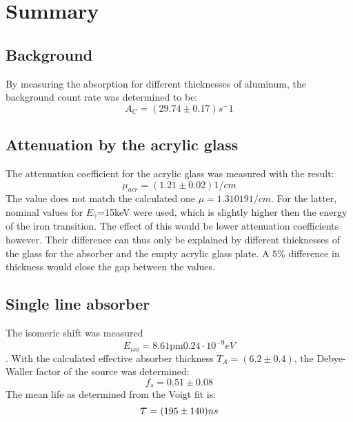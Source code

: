 \section{Summary}
\subsection{Background}
By measuring the absorption for different thicknesses of aluminum, the background count rate was determined to be:
\begin{equation*}
A_C= (29.74\pm0.17)s^-1
\end{equation*}	
\subsection{Attenuation by the acrylic glass}
The attenuation coefficient for the acrylic glass was measured with the result:
\begin{equation*}
\mu_{acr}=\unit{(1.21\pm0.02)}{1/cm}
\end{equation*}
The value does not match the calculated one $\mu=\unit{1.31019}{1/cm}$. For the latter, nominal values for $E_\gamma$=\unit{15}{keV} were used, which is slightly higher then the energy of the iron transition. The effect of this would be lower attenuation coefficients however. Their difference can thus only be explained by different thicknesses of the glass for the absorber and the empty acrylic glass plate. A $5\%$ difference in thickness would close the gap between the values.
\subsection{Single line absorber}
The isomeric shift was measured
\begin{equation*}
E_{iso}= \unit{8.61\pm0.24\cdot10^{-9}}{eV}
\end{equation*}. 
With the calculated effective absorber thickness $T_A=(6.2\pm0.4)$, the Debye-Waller factor of the source was determined:
\begin{equation*}
f_s=0.51\pm0.08
\end{equation*}
The mean life as determined from the Voigt fit is:
\begin{equation*}
\scalebox{1.5}{$\tau$}=\unit{(195\pm140)}{ns}
\end{equation*}

